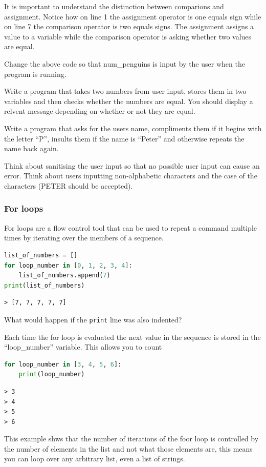It is important to understand the distinction between comparions and assignment. Notice how on line 1 the assignment operator is one equals sign while on line 7 the comparison operator is two equals signs. The assignment assigns a value to a variable while the comparison operator is asking whether two values are equal.
		\begin{task}Change the above code so that num\_penguins is input by the user when the program is running.\end{task}
		\begin{task}Write a program that takes two numbers from user input, stores them in two variables and then checks whether the numbers are equal. You should display a relvent message depending on whether or not they are equal.\end{task}
		\begin{task} Write a program that asks for the users name, compliments them if it begins with the letter ``P'', insults them if the name is ``Peter'' and otherwise repeats the name back again.\end{task}
		\begin{advancedtask}Think about sanitising the user input so that no possible user input can cause an error. Think about users inputting non-alphabetic characters and the case of the characters (PETER should be accepted).\end{advancedtask}


		\subsubsection{For loops}
		For loops are a flow control tool that can be used to repeat a command multiple times by iterating over the members of a sequence.
		\begin{lstlisting}[language=Python]
list_of_numbers = []
for loop_number in [0, 1, 2, 3, 4]:
	list_of_numbers.append(7)
print(list_of_numbers)\end{lstlisting}
		\begin{verbatim}> [7, 7, 7, 7, 7]\end{verbatim}

		\begin{task}What would happen if the \texttt{print} line was also indented?\end{task}
		Each time the for loop is evaluated the next value in the sequence is stored in the ``loop\_number'' variable. This allows you to count
		\begin{lstlisting}[language=Python]
for loop_number in [3, 4, 5, 6]:
	print(loop_number)\end{lstlisting}
\begin{verbatim}
> 3
> 4
> 5
> 6
\end{verbatim}
		This example shws that the number of iterations of the foor loop is controlled by the number of elements in the list and not what those elements are, this means you can loop over any arbitrary list, even a list of strings.

